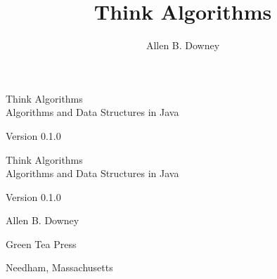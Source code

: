 \documentclass[12pt]{book}
\title{Think Algorithms}
\author{Allen B. Downey}
\newcommand{\thetitle}{Think Algorithms}
\newcommand{\thesubtitle}{Algorithms and Data Structures in Java}
\newcommand{\theauthors}{Allen B. Downey}
\newcommand{\theversion}{0.1.0}
\theoremstyle{exercise}
\newif\ifplastex
\begin{document}
\frontmatter

\ifplastex

\maketitle

\else

\begin{latexonly}

\thispagestyle{empty}

\begin{flushright}
\vspace*{2.0in}

\begin{spacing}{3}
{\huge \thetitle} \\
{\Large \thesubtitle}
\end{spacing}

\vspace{0.25in}

Version \theversion

\vfill
\end{flushright}

\newpage
\thispagestyle{empty}

\quad

\newpage
\thispagestyle{empty}

\begin{flushright}
\vspace*{2.0in}

\begin{spacing}{3}
{\huge \thetitle} \\
{\Large \thesubtitle}
\end{spacing}

\vspace{0.25in}

Version \theversion

\vspace{1in}

{\Large \theauthors}

\vspace{0.5in}

{\Large Green Tea Press}

{\small Needham, Massachusetts}

\vfill
\end{flushright}


\end{latexonly}
\end{document}
